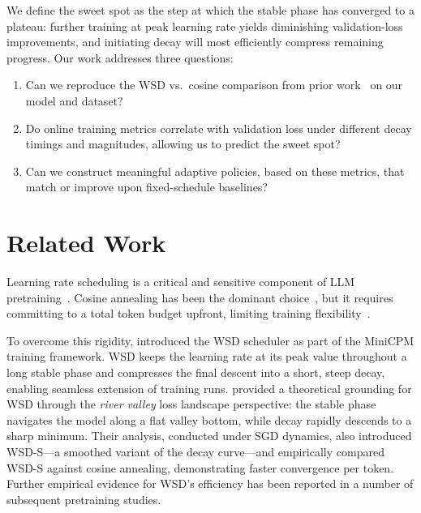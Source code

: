\documentclass[10pt,conference,compsocconf]{IEEEtran}
\begin{document}
We define the sweet spot as the step at which the stable phase has converged
to a plateau: further training at peak learning rate yields diminishing
validation-loss improvements, and initiating decay will most efficiently
compress remaining progress. Our work addresses three questions:
\begin{enumerate}
  \item Can we reproduce the WSD vs.\ cosine comparison from prior
        work~\cite{wen2024river} on our model and dataset?
  \item Do online training metrics correlate with validation loss under
        different decay timings and magnitudes, allowing us to predict the
        sweet spot?
  \item Can we construct meaningful adaptive policies, based on these
        metrics, that match or improve upon fixed-schedule baselines?
\end{enumerate}


\section{Related Work}

Learning rate scheduling is a critical and sensitive component of LLM
pretraining~\cite{kaplan2020scaling,hoffmann2022chinchilla}.
Cosine annealing has been the dominant choice~\cite{dubey2024llama3}, but it
requires committing to a total token budget upfront, limiting training
flexibility~\cite{defazio2024road,muennighoff2023scaling}.

To overcome this rigidity, \citet{minicpm} introduced the WSD scheduler as
part of the MiniCPM training framework. WSD keeps the learning rate at its
peak value throughout a long stable phase and compresses the final descent
into a short, steep decay, enabling seamless extension of training runs.
\citet{wen2024river} provided a theoretical grounding for WSD through the
\emph{river valley} loss landscape perspective: the stable phase navigates
the model along a flat valley bottom, while decay rapidly descends to a sharp
minimum. Their analysis, conducted under SGD dynamics, also introduced
WSD-S—a smoothed variant of the decay curve—and empirically compared WSD-S
against cosine annealing, demonstrating faster convergence per token.
Further empirical evidence for WSD's efficiency has been reported in a number
of subsequent pretraining studies.
\end{document}
